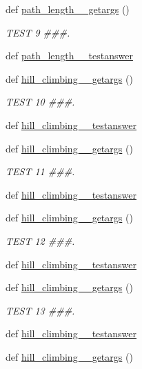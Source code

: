 \begin{DoxyCompactItemize}
def \hyperlink{namespacetests_afc1bc160c575acf9ec0d453ca034e374}{path\+\_\+length\+\_\+\_\+getargs} ()
\begin{DoxyCompactList}\small\item\em T\+E\+S\+T 9 \#\#\#. \end{DoxyCompactList}\item 
def \hyperlink{namespacetests_a98cc33866c90dfb7e288f88fb612f826}{path\+\_\+length\+\_\+\_\+testanswer}
\item 
def \hyperlink{namespacetests_a5fef075a28bc766499b92bc2f8c84109}{hill\+\_\+climbing\+\_\+\_\+getargs} ()
\begin{DoxyCompactList}\small\item\em T\+E\+S\+T 10 \#\#\#. \end{DoxyCompactList}\item 
def \hyperlink{namespacetests_a07718ec6a4669c110d04b38bf3869665}{hill\+\_\+climbing\+\_\+\_\+testanswer}
\item 
def \hyperlink{namespacetests_a364b12bcaaf8ac2c865ab1918ba4ffe7}{hill\+\_\+climbing\+\_\+\_\+getargs} ()
\begin{DoxyCompactList}\small\item\em T\+E\+S\+T 11 \#\#\#. \end{DoxyCompactList}\item 
def \hyperlink{namespacetests_a4a58b75d3dfa8d6069de0dc31a95d3bd}{hill\+\_\+climbing\+\_\+\_\+testanswer}
\item 
def \hyperlink{namespacetests_a993914a9fbf55269bcd28391855495ea}{hill\+\_\+climbing\+\_\+\_\+getargs} ()
\begin{DoxyCompactList}\small\item\em T\+E\+S\+T 12 \#\#\#. \end{DoxyCompactList}\item 
def \hyperlink{namespacetests_a7a721ae6267b0d6ba1bba6c51faa831c}{hill\+\_\+climbing\+\_\+\_\+testanswer}
\item 
def \hyperlink{namespacetests_a240bafa885d3e4df3c17b7b42d59261b}{hill\+\_\+climbing\+\_\+\_\+getargs} ()
\begin{DoxyCompactList}\small\item\em T\+E\+S\+T 13 \#\#\#. \end{DoxyCompactList}\item 
def \hyperlink{namespacetests_aa1f72ad553b0f1f783be013642ea9140}{hill\+\_\+climbing\+\_\+\_\+testanswer}
\item 
def \hyperlink{namespacetests_a8313d4fc2c4894a21cfcac81e290b9e7}{hill\+\_\+climbing\+\_\+\_\+getargs} ()

\end{DoxyCompactItemize}
